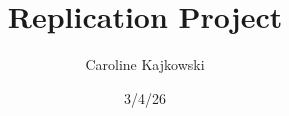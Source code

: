 \documentclass{beamer}
\title{Replication Project}
\author{Caroline Kajkowski}
\institute{Trinity College Dublin}
\date{3/4/26}
\begin{document}
\begin{frame}
	\titlepage
\end{frame}
\end{document}
